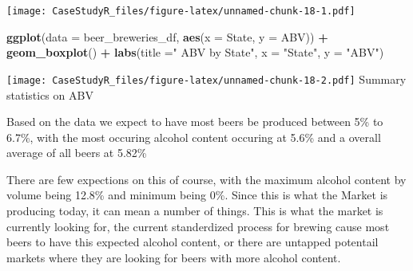 \documentclass[
]{article}
\newenvironment{Shaded}{\begin{snugshade}}{\end{snugshade}}
\newcommand{\DataTypeTok}[1]{\textcolor[rgb]{0.13,0.29,0.53}{#1}}
\newcommand{\KeywordTok}[1]{\textcolor[rgb]{0.13,0.29,0.53}{\textbf{#1}}}
\newcommand{\NormalTok}[1]{#1}
\newcommand{\OperatorTok}[1]{\textcolor[rgb]{0.81,0.36,0.00}{\textbf{#1}}}
\newcommand{\StringTok}[1]{\textcolor[rgb]{0.31,0.60,0.02}{#1}}
\begin{document}
\begin{Shaded}
\end{Shaded}

\texttt{[image: CaseStudyR\_files/figure-latex/unnamed-chunk-18-1.pdf]}

\begin{Shaded}
\begin{Highlighting}[]
\KeywordTok{ggplot}\NormalTok{(}\DataTypeTok{data =}\NormalTok{ beer_breweries_df, }\KeywordTok{aes}\NormalTok{(}\DataTypeTok{x =}\NormalTok{ State, }\DataTypeTok{y =}\NormalTok{ ABV)) }\OperatorTok{+}\StringTok{ }
\StringTok{  }\KeywordTok{geom_boxplot}\NormalTok{() }\OperatorTok{+}\StringTok{ }\KeywordTok{labs}\NormalTok{(}\DataTypeTok{title =}\StringTok{" ABV by State"}\NormalTok{, }\DataTypeTok{x =} \StringTok{"State"}\NormalTok{, }\DataTypeTok{y =} \StringTok{"ABV"}\NormalTok{)}
\end{Highlighting}
\end{Shaded}

\texttt{[image: CaseStudyR\_files/figure-latex/unnamed-chunk-18-2.pdf]}
Summary statistics on ABV

Based on the data we expect to have most beers be produced between 5\%
to 6.7\%, with the most occuring alcohol content occuring at 5.6\% and a
overall average of all beers at 5.82\%

There are few expections on this of course, with the maximum alcohol
content by volume being 12.8\% and minimum being 0\%. Since this is what
the Market is producing today, it can mean a number of things. This is
what the market is currently looking for, the current standerdized
process for brewing cause most beers to have this expected alcohol
content, or there are untapped potentail markets where they are looking
for beers with more alcohol content.
\end{document}
